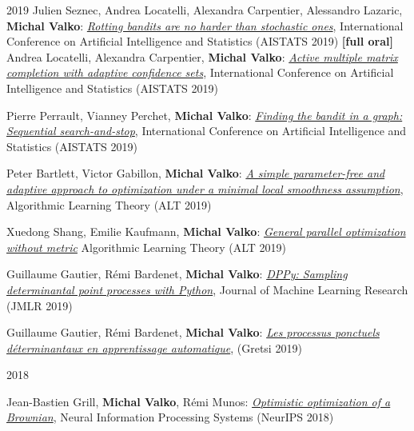 \documentclass{resume}
\begin{document}
\begin{category}{2019}
\citembullet
Julien Seznec, Andrea Locatelli, Alexandra Carpentier, Alessandro Lazaric, {\bf Michal Valko}:
\href{http://researchers.lille.inria.fr/~valko/hp/serve.php?what=publications/seznec2019rotting.pdf}{\emph{Rotting bandits are no harder than stochastic ones}},
International Conference on Artificial Intelligence and Statistics
({\sf AISTATS 2019})   {\bf [full oral]}
\citembullet
Andrea Locatelli, Alexandra Carpentier, {\bf Michal Valko}:
\href{http://researchers.lille.inria.fr/~valko/hp/serve.php?what=publications/locatelli2019active.pdf}
{\emph{Active multiple matrix completion with adaptive confidence sets}},
International Conference on Artificial Intelligence and Statistics
({\sf AISTATS 2019}) 


\citembullet
Pierre Perrault, Vianney Perchet,   {\bf Michal Valko}:
\href{http://researchers.lille.inria.fr/~valko/hp/serve.php?what=publications/perrault2019finding.pdf}
{\emph{Finding the bandit in a graph: Sequential search-and-stop}},
International Conference on Artificial Intelligence and Statistics
({\sf AISTATS 2019}) 


\citembullet
Peter Bartlett, Victor Gabillon,   {\bf Michal Valko}:
\href{http://researchers.lille.inria.fr/~valko/hp/serve.php?what=publications/bartlett2019simple.pdf}
{\emph{A simple parameter-free and adaptive approach to optimization under a minimal local smoothness assumption}},
Algorithmic Learning Theory
({\sf ALT 2019}) 

\citembullet
Xuedong Shang, Emilie Kaufmann, {\bf Michal Valko}:
\href{http://researchers.lille.inria.fr/~valko/hp/serve.php?what=publications/shang2019general.pdf}
{\emph{General parallel optimization without metric}}
Algorithmic Learning Theory
({\sf ALT 2019}) 



\citemnobullet
Guillaume Gautier, R\' emi Bardenet, {\bf Michal Valko}:
\href{https://arxiv.org/abs/1809.07258}
{\emph{DPPy: Sampling determinantal point processes with Python}},
Journal of Machine Learning Research
({\sf JMLR 2019}) 

\citembullet
Guillaume Gautier, R\' emi Bardenet, {\bf Michal Valko}:
\href{http://researchers.lille.inria.fr/~valko/hp/publications/gautier2019processus.pdf}
{\emph{Les processus ponctuels d\'eterminantaux en apprentissage automatique}},
({\sf Gretsi 2019}) 


\end{category}\begin{category}{2018}

\citembullet
Jean-Bastien Grill, {\bf Michal Valko}, R\' emi Munos:
\href{http://researchers.lille.inria.fr/~valko/hp/serve.php?what=publications/grill2018optimistic.pdf}
{\emph{Optimistic optimization of a Brownian}},
Neural Information Processing Systems
({\sf NeurIPS 2018}) 


\end{category}
\end{document}
